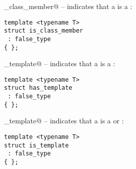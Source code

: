 \verb@is_class_member@ -- indicates that a  is a :
\begin{verbatim}
template <typename T>
struct is_class_member
 : false_type
{ };
\end{verbatim}

\verb@has_template@ -- indicates that a  is a :
\begin{verbatim}
template <typename T>
struct has_template
 : false_type
{ };
\end{verbatim}

\verb@is_template@ -- indicates that a  is a 
or :
\begin{verbatim}
template <typename T>
struct is_template
 : false_type
{ };
\end{verbatim}

